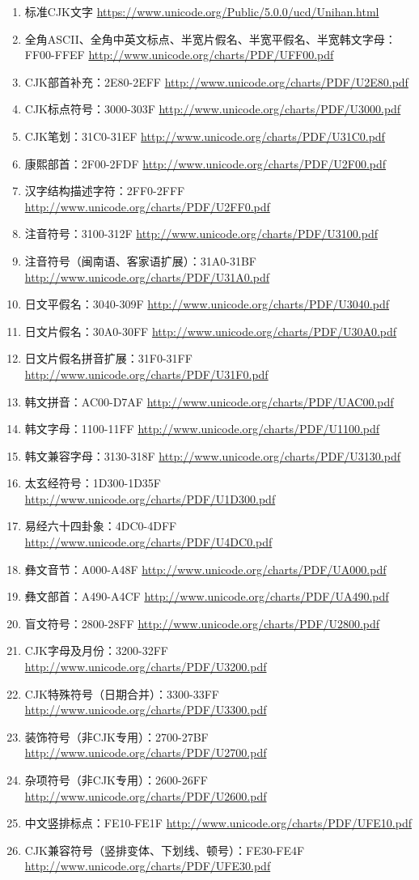 \begin{enumerate}
  \item 标准CJK文字 \url{https://www.unicode.org/Public/5.0.0/ucd/Unihan.html}
  \item 全角ASCII、全角中英文标点、半宽片假名、半宽平假名、半宽韩文字母：FF00-FFEF \url{http://www.unicode.org/charts/PDF/UFF00.pdf}
  \item CJK部首补充：2E80-2EFF \url{http://www.unicode.org/charts/PDF/U2E80.pdf}
  \item CJK标点符号：3000-303F \url{http://www.unicode.org/charts/PDF/U3000.pdf}
  \item CJK笔划：31C0-31EF \url{http://www.unicode.org/charts/PDF/U31C0.pdf}
  \item 康熙部首：2F00-2FDF \url{http://www.unicode.org/charts/PDF/U2F00.pdf}
  \item 汉字结构描述字符：2FF0-2FFF \url{http://www.unicode.org/charts/PDF/U2FF0.pdf}
  \item 注音符号：3100-312F \url{http://www.unicode.org/charts/PDF/U3100.pdf}
  \item 注音符号（闽南语、客家语扩展）：31A0-31BF \url{http://www.unicode.org/charts/PDF/U31A0.pdf}
  \item 日文平假名：3040-309F \url{http://www.unicode.org/charts/PDF/U3040.pdf}
  \item 日文片假名：30A0-30FF \url{http://www.unicode.org/charts/PDF/U30A0.pdf}
  \item 日文片假名拼音扩展：31F0-31FF \url{http://www.unicode.org/charts/PDF/U31F0.pdf}
  \item 韩文拼音：AC00-D7AF \url{http://www.unicode.org/charts/PDF/UAC00.pdf}
  \item 韩文字母：1100-11FF \url{http://www.unicode.org/charts/PDF/U1100.pdf}
  \item 韩文兼容字母：3130-318F \url{http://www.unicode.org/charts/PDF/U3130.pdf}
  \item 太玄经符号：1D300-1D35F \url{http://www.unicode.org/charts/PDF/U1D300.pdf}
  \item 易经六十四卦象：4DC0-4DFF \url{http://www.unicode.org/charts/PDF/U4DC0.pdf}
  \item 彝文音节：A000-A48F \url{http://www.unicode.org/charts/PDF/UA000.pdf}
  \item 彝文部首：A490-A4CF \url{http://www.unicode.org/charts/PDF/UA490.pdf}
  \item 盲文符号：2800-28FF \url{http://www.unicode.org/charts/PDF/U2800.pdf}
  \item CJK字母及月份：3200-32FF \url{http://www.unicode.org/charts/PDF/U3200.pdf}
  \item CJK特殊符号（日期合并）：3300-33FF \url{http://www.unicode.org/charts/PDF/U3300.pdf}
  \item 装饰符号（非CJK专用）：2700-27BF \url{http://www.unicode.org/charts/PDF/U2700.pdf}
  \item 杂项符号（非CJK专用）：2600-26FF \url{http://www.unicode.org/charts/PDF/U2600.pdf}
  \item 中文竖排标点：FE10-FE1F \url{http://www.unicode.org/charts/PDF/UFE10.pdf}
  \item CJK兼容符号（竖排变体、下划线、顿号）：FE30-FE4F \url{http://www.unicode.org/charts/PDF/UFE30.pdf}
\end{enumerate}
